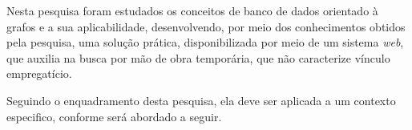 \par Nesta pesquisa foram estudados os conceitos de banco de dados orientado à grafos e a sua aplicabilidade, desenvolvendo, por meio dos conhecimentos obtidos pela pesquisa, uma solução prática, disponibilizada por meio de um sistema \textit{web}, que auxilia na busca por mão de obra temporária, que não caracterize vínculo empregatício.

\par Seguindo o enquadramento desta pesquisa, ela deve ser aplicada a um contexto especifico, conforme será abordado a seguir. 




